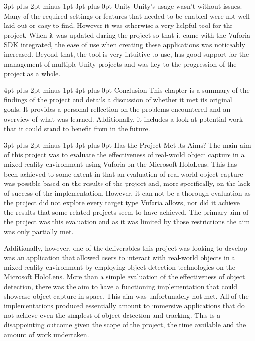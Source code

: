 \documentclass[12pt,a4paper,oneside]{article}
\makeatletter
\renewcommand\subsubsection{\@startsection {subsubsection}{1}{0mm} %
	                           {3pt plus 2pt minus 1pt} %
	                           {3pt plus 0pt} %
	                           {\normalfont\bfseries}}
\renewcommand\subsection{\@startsection {subsection}{1}{0mm} %
                               {3pt plus 2pt minus 1pt} %
                               {3pt plus 0pt} %
                               {\large\bfseries}}
\renewcommand\section{\@startsection {section}{1}{0mm} %
                               {4pt plus 2pt minus 1pt} %
                               {4pt plus 0pt} %
                               {\Large\bfseries}}
\makeatother
\begin{document}
\subsubsection{Unity}
Unity's usage wasn't without issues. Many of the required settings or features that needed to be enabled were not well laid out or easy to find. However it was otherwise a very helpful tool for the project. When it was updated during the project so that it came with the Vuforia SDK integrated, the ease of use when creating these applications was noticeably increased. Beyond that, the tool is very intuitive to use, has good support for the management of multiple Unity projects and was key to the progression of the project as a whole.
 
\newpage
\section{Conclusion}
This chapter is a summary of the findings of the project and details a discussion of whether it met its original goals. It provides a personal reflection on the problems encountered and an overview of what was learned. Additionally, it includes a look at potential work that it could stand to benefit from in the future.

\subsection{Has the Project Met its Aims?}
The main aim of this project was to evaluate the effectiveness of real-world object capture in a mixed reality environment using Vuforia on the Microsoft HoloLens. This has been achieved to some extent in that an evaluation of real-world object capture was possible based on the results of the project and, more specifically, on the lack of success of the implementation. However, it can not be a thorough evaluation as the project did not explore every target type Vuforia allows, nor did it achieve the results that some related projects seem to have achieved. The primary aim of the project was this evaluation and as it was limited by those restrictions the aim was only partially met.

Additionally, however, one of the deliverables this project was looking to develop was an application that allowed users to interact with real-world objects in a mixed reality environment by employing object detection technologies on the Microsoft HoloLens. More than a simple evaluation of the effectiveness of object detection, there was the aim to have a functioning implementation that could showcase object capture in space. This aim was unfortunately not met. All of the implementations produced essentially amount to immersive applications that do not achieve even the simplest of object detection and tracking. This is a disappointing outcome given the scope of the project, the time available and the amount of work undertaken.
\end{document}
